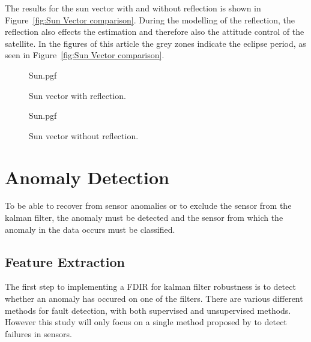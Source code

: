 \documentclass[letterpaper, 10 pt, conference]{ieeeconf}  %
\begin{document}
The results for the sun vector with and without reflection is shown in Figure~\ref{fig:Sun Vector comparison}. During the modelling of the reflection, the reflection also effects the estimation and therefore also the attitude control of the satellite. In the figures of this article the grey zones indicate the eclipse period, as seen in Figure~\ref{fig:Sun Vector comparison}.

\begin{figure*}[!htb]
\begin{subfigure}{.5\textwidth}
	\centering
	{Sun.pgf}
	\caption[Sun vector with reflection]{Sun vector with reflection.}
	\label{fig:Sun Vector comparison with reflection}
\end{subfigure}
\begin{subfigure}{.5\textwidth}
	\centering
	{Sun.pgf} 
	\caption[Sun vector without reflection]{Sun vector without reflection.}
	\label{fig:Sun Vector comparison without reflection}
\end{subfigure}

\caption{Comparison of Sun Vector with and without Reflection}
\label{fig:Sun Vector comparison}

\end{figure*}


\section{Anomaly Detection}
To be able to recover from sensor anomalies or to exclude the sensor from the kalman filter, the anomaly must be detected and the sensor from which the anomaly in the data occurs must be classified.

\subsection{Feature Extraction}
The first step to implementing a FDIR for kalman filter robustness is to detect whether an anomaly has occured on one of the filters. There are various different methods for fault detection, with both supervised and unsupervised methods. However this study will only focus on a single method proposed by \textcite{DeSilva2020} to detect failures in sensors.
\end{document}
